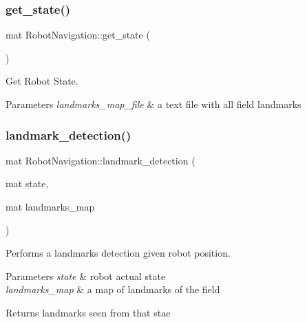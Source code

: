 \subsubsection{\texorpdfstring{get\+\_\+state()}{get\_state()}}
{\footnotesize\ttfamily mat Robot\+Navigation\+::get\+\_\+state (\begin{DoxyParamCaption}{ }\end{DoxyParamCaption})}



Get Robot State. 


\begin{DoxyParams}{Parameters}
{\em landmarks\+\_\+map\+\_\+file} & a text file with all field landmarks \\
\hline
\end{DoxyParams}
\mbox{\label{class_robot_navigation_a94927041a7f2f2bc9c45803a84d5a9d6}} 
\subsubsection{\texorpdfstring{landmark\+\_\+detection()}{landmark\_detection()}}
{\footnotesize\ttfamily mat Robot\+Navigation\+::landmark\+\_\+detection (\begin{DoxyParamCaption}\item[{mat}]{state,  }\item[{mat}]{landmarks\+\_\+map }\end{DoxyParamCaption})}



Performs a landmarks detection given robot position. 


\begin{DoxyParams}{Parameters}
{\em state} & robot actual state \\
\hline
{\em landmarks\+\_\+map} & a map of landmarks of the field \\
\hline
\end{DoxyParams}
\begin{DoxyReturn}{Returns}
landmarks seen from that stae 
\end{DoxyReturn}
\mbox{\label{class_robot_navigation_af936fdf445213270848a4fc881d1cdb7}} 
